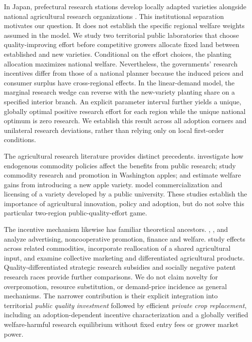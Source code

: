 \documentclass[USenglish]{article}
\begin{document}
In Japan, prefectural research stations develop locally adapted varieties alongside national agricultural research organizations \citep{oecd2019japan}. This institutional separation motivates our question. It does not establish the specific regional welfare weights assumed in the model.
We study two territorial public laboratories that choose quality-improving effort before competitive growers allocate fixed land between established and new varieties. Conditional on the effort choices, the planting allocation maximizes national welfare. Nevertheless, the governments' research incentives differ from those of a national planner because the induced prices and consumer surplus have cross-regional effects. In the linear-demand model, the marginal research wedge can reverse with the new-variety planting share on a specified interior branch. An explicit parameter interval further yields a unique, globally optimal positive research effort for each region while the unique national optimum is zero research. We establish this result across all adoption corners and unilateral research deviations, rather than relying only on local first-order conditions.

The agricultural research literature provides distinct precedents. \citet{swinnen1998endogenous} investigate how endogenous commodity policies affect the benefits from public research; \citet{richards2002commodity} study commodity research and promotion in Washington apples; and \citet{wang2020honeycrisp} estimate welfare gains from introducing a new apple variety. \citet{akhundjanov2020apple} model commercialization and licensing of a variety developed by a public university. These studies establish the importance of agricultural innovation, policy and adoption, but do not solve this particular two-region public-quality-effort game.

The incentive mechanism likewise has familiar theoretical ancestors. \citet{dixit1978advertising}, \citet{alston2001beggar}, \citet{freebairn2001funding} and \citet{cardon2003market} analyze advertising, noncooperative promotion, finance and welfare. \citet{kinnucan2000distributional} study effects across related commodities, \citet{balagtas2007dairy} incorporate reallocation of a shared agricultural input, and \citet{lence2007collective} examine collective marketing and differentiated agricultural products. Quality-differentiated strategic research subsidies \citep{jinji2013strategic} and socially negative patent research races \citep{zhang2022negative} provide further comparisons. We do not claim novelty for overpromotion, resource substitution, or demand-price incidence as general mechanisms. The narrower contribution is their explicit integration into territorial \emph{public quality investment} followed by efficient \emph{private crop replacement}, including an adoption-dependent incentive characterization and a globally verified welfare-harmful research equilibrium without fixed entry fees or grower market power.
\end{document}
